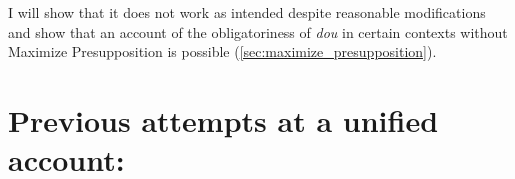 \documentclass[12pt]{article}
\begin{document}
I will show that it does not work as intended despite reasonable modifications and show that an account of the obligatoriness of \emph{dou} in certain contexts without Maximize Presupposition is possible (\cref{sec:maximize_presupposition}).



\section[Previous attempts at a unified account]{Previous attempts at a unified account: \citet{liuVarietiesAlternativesMandarin2017,liuPragmaticExplanationMeidou2021}}
\label{sec:previous_attempts_at_a_unified_account}
\end{document}
